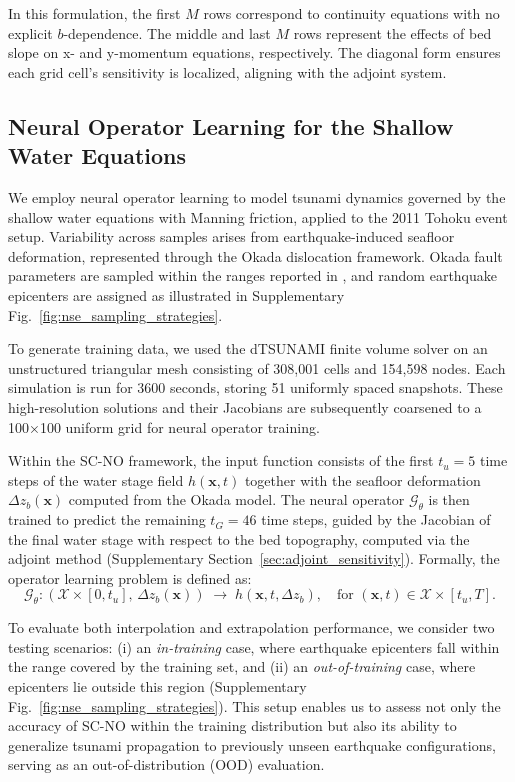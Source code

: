 In this formulation, the first \( M \) rows correspond to continuity equations with no explicit \( b \)-dependence. The middle and last \( M \) rows represent the effects of bed slope on x- and y-momentum equations, respectively. The diagonal form ensures each grid cell's sensitivity is localized, aligning with the adjoint system.



\subsection*{Neural Operator Learning for the Shallow Water Equations}

We employ neural operator learning to model tsunami dynamics governed by the shallow water equations with Manning friction, applied to the 2011 Tohoku event setup. Variability across samples arises from earthquake-induced seafloor deformation, represented through the Okada dislocation framework. Okada fault parameters are sampled within the ranges reported in \citep{grilli2013numerical}, and random earthquake epicenters are assigned as illustrated in Supplementary Fig.~\ref{fig:nse_sampling_strategies}.  

To generate training data, we used the dTSUNAMI finite volume solver on an unstructured triangular mesh consisting of 308,001 cells and 154,598 nodes. Each simulation is run for 3600 seconds, storing 51 uniformly spaced snapshots. These high-resolution solutions and their Jacobians are subsequently coarsened to a 100×100 uniform grid for neural operator training.

Within the SC-NO framework, the input function consists of the first $t_u = 5$ time steps of the water stage field $h(\mathbf{x}, t)$ together with the seafloor deformation $\Delta z_b(\mathbf{x})$ computed from the Okada model. The neural operator $\mathcal{G}_\theta$ is then trained to predict the remaining $t_G = 46$ time steps, guided by the Jacobian of the final water stage with respect to the bed topography, computed via the adjoint method (Supplementary Section~\ref{sec:adjoint_sensitivity}). Formally, the operator learning problem is defined as:
\begin{equation}
\mathcal{G}_\theta : \left( \mathcal{X} \times [0, t_u], \, \Delta z_b(\mathbf{x}) \right) \;\to\; h(\mathbf{x}, t, \Delta z_b), 
\quad \text{for } (\mathbf{x}, t) \in \mathcal{X} \times [t_u, T].
\end{equation}

To evaluate both interpolation and extrapolation performance, we consider two testing scenarios: (i) an \textit{in-training} case, where earthquake epicenters fall within the range covered by the training set, and (ii) an \textit{out-of-training} case, where epicenters lie outside this region (Supplementary Fig.~\ref{fig:nse_sampling_strategies}). This setup enables us to assess not only the accuracy of SC-NO within the training distribution but also its ability to generalize tsunami propagation to previously unseen earthquake configurations, serving as an out-of-distribution (OOD) evaluation.  


